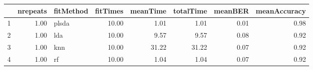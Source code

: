 \begin{table}[ht]
\centering
\begin{tabular}{rrlrrrrr}
  \hline
 & nrepeats & fitMethod & fitTimes & meanTime & totalTime & meanBER & meanAccuracy \\ 
  \hline
1 & 1.00 & plsda & 10.00 & 1.01 & 1.01 & 0.01 & 0.98 \\ 
  2 & 1.00 & lda & 10.00 & 9.57 & 9.57 & 0.08 & 0.92 \\ 
  3 & 1.00 & knn & 10.00 & 31.22 & 31.22 & 0.07 & 0.92 \\ 
  4 & 1.00 & rf & 10.00 & 1.04 & 1.04 & 0.07 & 0.92 \\ 
   \hline
\end{tabular}
\end{table}
